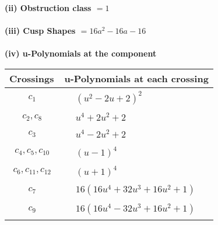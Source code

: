 \documentclass[1p]{elsarticle_modified}
\theoremstyle{definition}
\begin{document}
\flushleft \textbf{(ii) Obstruction class $= 1$}\\~\\
\flushleft \textbf{(iii) Cusp Shapes $= 16 a^2-16 a-16$}\\~\\
\newpage\renewcommand{\arraystretch}{1}
\flushleft \textbf{(iv) u-Polynomials at the component}\newline \\
\begin{tabular}{m{50pt}|m{274pt}}
Crossings & \hspace{64pt}u-Polynomials at each crossing \\
\hline $$\begin{aligned}c_{1}\end{aligned}$$&$\begin{aligned}
&(u^2-2 u+2)^2
\end{aligned}$\\
\hline $$\begin{aligned}c_{2},c_{8}\end{aligned}$$&$\begin{aligned}
&u^4+2 u^2+2
\end{aligned}$\\
\hline $$\begin{aligned}c_{3}\end{aligned}$$&$\begin{aligned}
&u^4-2 u^2+2
\end{aligned}$\\
\hline $$\begin{aligned}c_{4},c_{5},c_{10}\end{aligned}$$&$\begin{aligned}
&(u-1)^4
\end{aligned}$\\
\hline $$\begin{aligned}c_{6},c_{11},c_{12}\end{aligned}$$&$\begin{aligned}
&(u+1)^4
\end{aligned}$\\
\hline $$\begin{aligned}c_{7}\end{aligned}$$&$\begin{aligned}
&16(16 u^4+32 u^3+16 u^2+1)
\end{aligned}$\\
\hline $$\begin{aligned}c_{9}\end{aligned}$$&$\begin{aligned}
&16(16 u^4-32 u^3+16 u^2+1)
\end{aligned}$\\
\hline
\end{tabular}\\~\\
\end{document}
